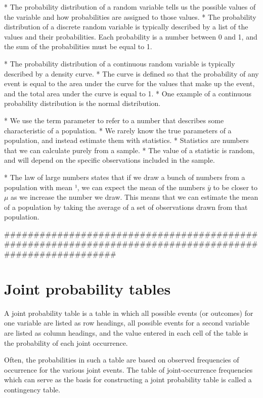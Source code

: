 \begin{itemize}
*  The probability distribution of a random variable tells us the possible values of the variable and how
probabilities are assigned to those values.
*  The probability distribution of a discrete random variable is typically described by a list of the
values and their probabilities. Each probability is a number between 0 and 1, and the sum of the
probabilities must be equal to 1.

*  The probability distribution of a continuous random variable is typically described by a density
curve. *  The curve is defined so that the probability of any event is equal to the area under the
curve for the values that make up the event, and the total area under the curve is equal to 1. *  One
example of a continuous probability distribution is the normal distribution.

*  We use the term parameter to refer to a number that describes some characteristic of a population. *   We
rarely know the true parameters of a population, and instead estimate them with statistics. *  Statistics
are numbers that we can calculate purely from a sample. *  The value of a statistic is random, and will
depend on the specific observations included in the sample.

*  The law of large numbers states that if we draw a bunch of numbers from a population with mean ¹,
we can expect the mean of the numbers $\bar{y}$ to be closer to $\mu$ as we increase the number we draw. This
means that we can estimate the mean of a population by taking the average of a set of observations
drawn from that population.
\end{itemize}
#########################################################################################################

\section{Joint probability tables}
A joint probability table is a table in which all possible events (or outcomes) for one variable are listed as
row headings, all possible events for a second variable are listed as column headings, and the value entered in
each cell of the table is the probability of each joint occurrence. 

Often, the probabilities in such a table are based
on observed frequencies of occurrence for the various joint events. The table
of joint-occurrence frequencies which can serve as the basis for constructing a joint probability table is called a
contingency table.

